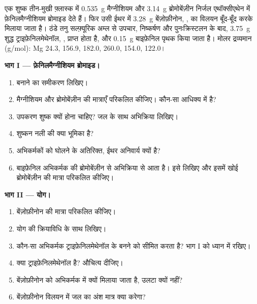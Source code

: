 \begin{problem}
\label{pb:b1:organomagnesium:1}
एक शुष्क तीन-मुखी फ़्लास्क में \qty{0.535}{g} मैग्नीशियम और
\qty{3.14}{g} ब्रोमोबेंज़ीन निर्जल एथॉक्सीएथेन में
फ़ेनिलमैग्नीशियम ब्रोमाइड देते हैं। फिर उसी ईथर में \qty{3.28}{g} बेंज़ोफ़ीनोन,
, का विलयन बूँद-बूँद करके मिलाया जाता है। ठंडे तनु सल्फ़्यूरिक अम्ल से
उपचार, निष्कर्षण और पुनःक्रिस्टलन के बाद,
\qty{3.75}{g} शुद्ध ट्राइफ़ेनिलमेथेनॉल, , प्राप्त होता है,
और \qty{0.15}{g} बाइफ़ेनिल पृथक किया जाता है। मोलर द्रव्यमान (\unit{g/mol}):
Mg 24.3,  156.9,  182.0,  260.0,
 154.0,  122.0।

\medskip
\noindent\textbf{भाग I --- फ़ेनिलमैग्नीशियम ब्रोमाइड।}
\begin{enumerate}
  \item बनाने का समीकरण लिखिए।
  \item मैग्नीशियम और ब्रोमोबेंज़ीन की मात्राएँ परिकलित कीजिए। कौन-सा
        आधिक्य में है?
  \item उपकरण शुष्क क्यों होना चाहिए? जल के साथ अभिक्रिया लिखिए।
  \item शुष्कन नली की क्या भूमिका है?
  \item अभिकर्मकों को घोलने के अतिरिक्त, ईथर अनिवार्य क्यों है?
  \item बाइफ़ेनिल अभिकर्मक की ब्रोमोबेंज़ीन से अभिक्रिया से आता है।
        इसे लिखिए और इसमें खोई ब्रोमोबेंज़ीन की मात्रा परिकलित कीजिए।
\end{enumerate}

\medskip
\noindent\textbf{भाग II --- योग।}
\begin{enumerate}[resume]
  \item बेंज़ोफ़ीनोन की मात्रा परिकलित कीजिए।
  \item योग की क्रियाविधि  के साथ लिखिए।
  \item कौन-सा अभिकर्मक ट्राइफ़ेनिलमेथेनॉल के बनने को सीमित करता है? भाग I को
        ध्यान में रखिए।
  \item क्या ट्राइफ़ेनिलमेथेनॉल  है? औचित्य दीजिए।
  \item बेंज़ोफ़ीनोन को अभिकर्मक में क्यों मिलाया जाता है, उलटा क्यों नहीं?
  \item बेंज़ोफ़ीनोन विलयन में जल का अंश मात्र क्या करेगा?
\end{enumerate}


\end{problem}
